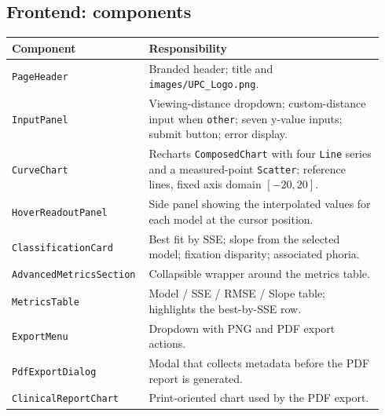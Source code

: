 \documentclass[11pt,a4paper]{article}
\begin{document}
\subsection{Frontend: components}
\begin{longtable}{@{}p{0.32\linewidth} p{0.62\linewidth}@{}}
\toprule
\textbf{Component} & \textbf{Responsibility} \\
\midrule
\texttt{PageHeader}             & Branded header; title and
                                  \texttt{images/UPC\_Logo.png}. \\
\texttt{InputPanel}             & Viewing-distance dropdown; custom-distance
                                  input when \texttt{other}; seven y-value
                                  inputs; submit button; error display. \\
\texttt{CurveChart}             & Recharts \texttt{ComposedChart} with four
                                  \texttt{Line} series and a measured-point
                                  \texttt{Scatter}; reference lines, fixed
                                  axis domain $[-20,20]$. \\
\texttt{HoverReadoutPanel}      & Side panel showing the interpolated values
                                  for each model at the cursor position. \\
\texttt{ClassificationCard}     & Best fit by SSE; slope from the selected
                                  model; fixation disparity; associated
                                  phoria. \\
\texttt{AdvancedMetricsSection} & Collapsible wrapper around the metrics
                                  table. \\
\texttt{MetricsTable}           & Model / SSE / RMSE / Slope table;
                                  highlights the best-by-SSE row. \\
\texttt{ExportMenu}             & Dropdown with PNG and PDF export actions. \\
\texttt{PdfExportDialog}        & Modal that collects metadata before the
                                  PDF report is generated. \\
\texttt{ClinicalReportChart}    & Print-oriented chart used by the PDF
                                  export. \\
\bottomrule
\end{longtable}
\end{document}
